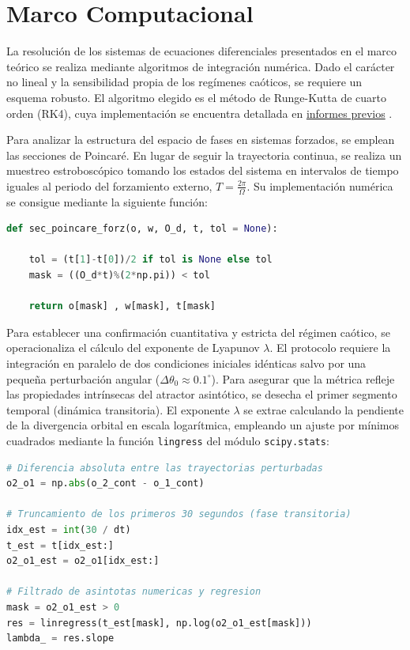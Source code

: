 \section{Marco Computacional}

La resolución de los sistemas de ecuaciones diferenciales presentados en el marco teórico se realiza mediante algoritmos de integración numérica. Dado el carácter no lineal y la sensibilidad propia de los regímenes caóticos, se requiere un esquema robusto. El algoritmo elegido es el método de Runge-Kutta de cuarto orden (RK4), cuya implementación se encuentra detallada en \href{https://github.com/JorgeAcebes/advanced-computing-uam/blob/main/reports/3_projectile/3_projectile.pdf}{informes previos} \citep{proyectiles_3}.

Para analizar la estructura del espacio de fases en sistemas forzados, se emplean las secciones de Poincaré. En lugar de seguir la trayectoria continua, se realiza un muestreo estroboscópico tomando los estados del sistema en intervalos de tiempo iguales al periodo del forzamiento externo, $T = \frac{2\pi}{\Omega}$. Su implementación numérica se consigue mediante la siguiente función:

\begin{lstlisting}[language=Python, caption={Obtención de estados $(\theta, \omega, t)$ para la sección de Poincaré.}]
def sec_poincare_forz(o, w, O_d, t, tol = None):

    tol = (t[1]-t[0])/2 if tol is None else tol
    mask = ((O_d*t)%(2*np.pi)) < tol
    
    return o[mask] , w[mask], t[mask]
\end{lstlisting}


Para establecer una confirmación cuantitativa y estricta del régimen caótico, se operacionaliza el cálculo del exponente de Lyapunov $\lambda$. El protocolo requiere la integración en paralelo de dos condiciones iniciales idénticas salvo por una pequeña perturbación angular ($\Delta\theta_0 \approx 0.1^\circ$). Para asegurar que la métrica refleje las propiedades intrínsecas del atractor asintótico, se desecha el primer segmento temporal (dinámica transitoria). El exponente $\lambda$ se extrae calculando la pendiente de la divergencia orbital en escala logarítmica, empleando un ajuste por mínimos cuadrados mediante la función \texttt{lingress} del módulo \texttt{scipy.stats}:

\begin{lstlisting}[language=Python, caption={Cálculo lineal del exponente de Lyapunov descartando el régimen dinámico transitorio.}]
# Diferencia absoluta entre las trayectorias perturbadas
o2_o1 = np.abs(o_2_cont - o_1_cont)

# Truncamiento de los primeros 30 segundos (fase transitoria)
idx_est = int(30 / dt)
t_est = t[idx_est:]
o2_o1_est = o2_o1[idx_est:]

# Filtrado de asintotas numericas y regresion
mask = o2_o1_est > 0
res = linregress(t_est[mask], np.log(o2_o1_est[mask]))
lambda_ = res.slope
\end{lstlisting}


